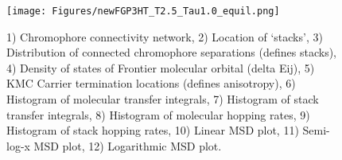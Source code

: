 \documentclass[12pt]{article}
\begin{document}
\begin{figure}[h]\centering
	\texttt{[image: Figures/newFGP3HT\_T2.5\_Tau1.0\_equil.png]}
    \caption{   1) Chromophore connectivity network, 
                2) Location of `stacks', 
                3) Distribution of connected chromophore separations (defines stacks),
                4) Density of states of Frontier molecular orbital (delta Eij),
                5) KMC Carrier termination locations (defines anisotropy),
                6) Histogram of molecular transfer integrals,
                7) Histogram of stack transfer integrals,
                8) Histogram of molecular hopping rates,
                9) Histogram of stack hopping rates,
                10) Linear MSD plot,
                11) Semi-log-x MSD plot,
                12) Logarithmic MSD plot.}
	\label{fig:T2.5}
\end{figure}

%
%
%
%




\end{document}
